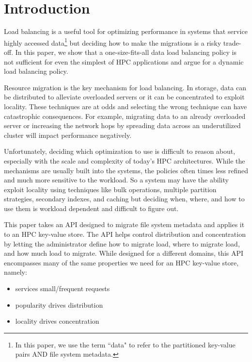 \section{Introduction}

Load balancing is a useful tool for optimizing performance in systems that
service highly accessed data\footnote{In this paper, we use the term ``data" to
refer to the partitioned key-value pairs AND file system metadata.} but
deciding how to make the migrations is a risky trade-off. In this paper, we
show that a one-size-fits-all data load balancing policy is not sufficient for
even the simplest of HPC applications and argue for a dynamic load balancing
policy.

Resource migration is the key mechanism for load balancing. In storage, data
can be distributed to alleviate overloaded servers or it can be concentrated to
exploit locality. These techniques are at odds and selecting the wrong
technique can have catastrophic consequences. For example, migrating data to an
already overloaded server or increasing the network hops by spreading data
across an underutilized cluster will impact performance negatively.

Unfortunately, deciding which optimization to use is difficult to reason about,
especially with the scale and complexity of today's HPC architectures. While
the mechanisms are usually built into the systems, the policies often times
less refined and much more sensitive to the workload. So a system may have the
ability exploit locality using techniques like bulk operations, multiple
partition strategies, secondary indexes, and caching but deciding when, where,
and how to use them is workload dependent and difficult to figure out.

This paper takes an API designed to migrate file system metadata and applies it
to an HPC key-value store.  The API helps control distribution and
concentration by letting the administrator define how to migrate load, where to
migrate load, and how much load to migrate. While designed for a different
domains, this API encompasses many of the same properties we need for an HPC
key-value store, namely:

\begin{itemize}
  \item services small/frequent requests
  \item popularity drives distribution
  \item locality drives concentration
\end{itemize}

